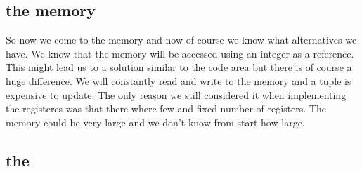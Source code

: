 \documentclass[a4paper,11pt]{article}
\begin{document}
\subsection{the memory}

So now we come to the memory and now of course we know what
alternatives we have. We know that the memory will be accessed using
an integer as a reference. This might lead us to a solution similar to
the code area but there is of course a huge difference. We will
constantly read and write to the memory and a tuple is expensive to
update. The only reason we still considered it when implementing the
registeres was that there where few and fixed number of registers. The
memory could be very large and we don't know from start how large.




 \subsection{the }
\end{document}
